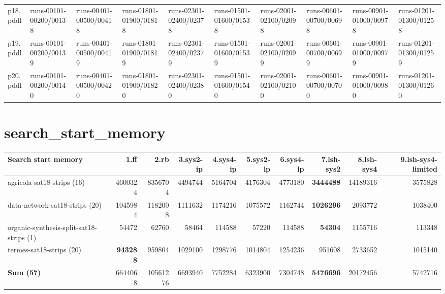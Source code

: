 \documentclass{article}
\newcommand{\numtasks}[1]{\small{(#1)}}
\begin{document}
\begin{tabular}{@{}lrrrrrrrrr@{}}
p18.pddl & \multicolumn{1}{|l|}{runs-00101-00200/00138} & \multicolumn{1}{|l|}{runs-00401-00500/00418} & \multicolumn{1}{|l|}{runs-01801-01900/01818} & \multicolumn{1}{|l|}{runs-02301-02400/02378} & \multicolumn{1}{|l|}{runs-01501-01600/01538} & \multicolumn{1}{|l|}{runs-02001-02100/02098} & \multicolumn{1}{|l|}{runs-00601-00700/00698} & \multicolumn{1}{|l|}{runs-00901-01000/00978} & \multicolumn{1}{|l|}{runs-01201-01300/01258} \\
p19.pddl & \multicolumn{1}{|l|}{runs-00101-00200/00139} & \multicolumn{1}{|l|}{runs-00401-00500/00419} & \multicolumn{1}{|l|}{runs-01801-01900/01819} & \multicolumn{1}{|l|}{runs-02301-02400/02379} & \multicolumn{1}{|l|}{runs-01501-01600/01539} & \multicolumn{1}{|l|}{runs-02001-02100/02099} & \multicolumn{1}{|l|}{runs-00601-00700/00699} & \multicolumn{1}{|l|}{runs-00901-01000/00979} & \multicolumn{1}{|l|}{runs-01201-01300/01259} \\
p20.pddl & \multicolumn{1}{|l|}{runs-00101-00200/00140} & \multicolumn{1}{|l|}{runs-00401-00500/00420} & \multicolumn{1}{|l|}{runs-01801-01900/01820} & \multicolumn{1}{|l|}{runs-02301-02400/02380} & \multicolumn{1}{|l|}{runs-01501-01600/01540} & \multicolumn{1}{|l|}{runs-02001-02100/02100} & \multicolumn{1}{|l|}{runs-00601-00700/00700} & \multicolumn{1}{|l|}{runs-00901-01000/00980} & \multicolumn{1}{|l|}{runs-01201-01300/01260} \\
\end{tabular}

\hypertarget{search_start_memory}{}
\section*{search\_start\_memory}

\begin{tabular}{@{}lrrrrrrrrr@{}}
Search start memory & 1.ff & 2.rb & 3.sys2-ip & 4.sys4-ip & 5.sys2-lp & 6.sys4-lp & 7.lsh-sys2 & 8.lsh-sys4 & 9.lsh-sys4-limited \\
\midrule
agricola-sat18-strips \numtasks{16} & 4600324 & 8356704 & 4494744 & 5164704 & 4176304 & 4773180 & \textbf{3444488} & 14189316 & 3575828 \\
data-network-sat18-strips \numtasks{20} & 1045984 & 1182008 & 1111632 & 1174216 & 1075572 & 1162744 & \textbf{1026296} & 2093772 & 1038400 \\
organic-synthesis-split-sat18-strips \numtasks{1} & 54472 & 62760 & 58464 & 114588 & 57220 & 114588 & \textbf{54304} & 1155716 & 113348 \\
termes-sat18-strips \numtasks{20} & \textbf{943288} & 959804 & 1029100 & 1298776 & 1014804 & 1254236 & 951608 & 2733652 & 1015140 \\
\textbf{Sum \numtasks{57}} & 6644068 & 10561276 & 6693940 & 7752284 & 6323900 & 7304748 & \textbf{5476696} & 20172456 & 5742716 \\
\end{tabular}
\end{document}
